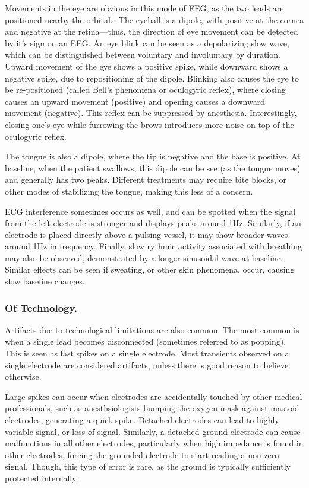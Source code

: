 Movements in the eye are obvious in this mode of EEG, as the two leads are positioned nearby the orbitals. The eyeball is a dipole, with positive at the cornea and negative at the retina---thus, the direction of eye movement can be detected by it's sign on an EEG. An eye blink can be seen as a depolarizing slow wave, which can be distinguished between voluntary and involuntary by duration. Upward movement of the eye shows a positive spike, while downward shows a negative spike, due to repositioning of the dipole. Blinking also causes the eye to be re-positioned (called Bell's phenomena or oculogyric reflex), where closing causes an upward movement (positive) and opening causes a downward movement (negative). This reflex can be suppressed by anesthesia. Interestingly, closing one's eye while furrowing the brows introduces more noise on top of the oculogyric reflex.\newline

The tongue is also a dipole, where the tip is negative and the base is positive. At baseline, when the patient swallows, this dipole can be see (as the tongue moves) and generally has two peaks. Different treatments may require bite blocks, or other modes of stabilizing the tongue, making this less of a concern.\newline

ECG interference sometimes occurs as well, and can be spotted when the signal from the left electrode is stronger and displays peaks around 1Hz. Similarly, if an electrode is placed directly above a pulsing vessel, it may show broader waves around 1Hz in frequency. Finally, slow rythmic activity associated with breathing may also be observed, demonstrated by a longer sinusoidal wave at baseline. Similar effects can be seen if sweating, or other skin phenomena, occur, causing slow baseline changes. 

\subsubsection{Of Technology.}

Artifacts due to technological limitations are also common. The most common is when a single lead becomes disconnected (sometimes referred to as popping). This is seen as fast spikes on a single electrode. Most transients observed on a single electrode are considered artifacts, unless there is good reason to believe otherwise.\newline

Large spikes can occur when electrodes are accidentally touched by other medical professionals, such as anesthsiologists bumping the oxygen mask against mastoid electrodes, generating a quick spike. Detached electrodes can lead to highly variable signal, or loss of signal. Similarly, a detached ground electrode can cause malfunctions in all other electrodes, particularly when high impedance is found in other electrodes, forcing the grounded electrode to start reading a non-zero signal. Though, this type of error is rare, as the ground is typically sufficiently protected internally. 

